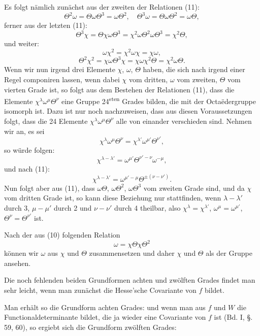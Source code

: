 
Es folgt nämlich zunächst aus der zweiten der Relationen (11):
\[
\Theta^2\omega = \Theta\omega\Theta^3 = \omega\Theta^2, \quad \Theta^3\omega = \Theta\omega\Theta^2 = \omega\Theta,
\]
ferner aus der letzten (11):
\[
\Theta^3\chi = \Theta\chi\omega\Theta^3 = \chi^2\omega\Theta^2\omega\Theta^3 = \chi^2\Theta,
\]
und weiter:
\[
\omega\chi^2 = \chi^2\omega\chi = \chi\omega,
\]
\[
\Theta^2\chi^2 = \chi\omega\Theta^3\chi = \chi\omega\chi^2\Theta = \chi^2\omega\Theta.
\]
Wenn wir nun irgend drei Elemente $\chi$, $\omega$, $\Theta$ haben, die
sich nach irgend einer Regel componiren lassen, wenn dabei $\chi$ vom
dritten, $\omega$ vom zweiten, $\Theta$ vom vierten Grade ist, so folgt aus
dem Bestehen der Relationen (11), dass die Elemente
$\chi^{\lambda}\omega^{\mu}\Theta^{\nu}$ eine Gruppe 24\textsuperscript{sten} Grades bilden, die mit
der Octaëdergruppe isomorph ist. Dazu ist nur noch nachzuweisen,
dass aus diesen Voraussetzungen folgt, dass die 24 Elemente
$\chi^{\lambda}\omega^{\mu}\Theta^{\nu}$ alle von einander verschieden sind. Nehmen wir
an, es sei
\[
\chi^{\lambda}\omega^{\mu}\Theta^{\nu} = \chi^{\lambda'}\omega^{\mu'}\Theta^{\nu'},
\]
so würde folgen:
\[
\chi^{\lambda - \lambda'} = \omega^{\mu'}\Theta^{\nu' - \nu}\omega^{-\mu},
\]
und nach (11):
\[
\chi^{\lambda - \lambda'} = \omega^{\mu' - \mu}\Theta^{\pm(\nu - \nu')}.
\]
Nun folgt aber aus (11), dass $\omega\Theta$, $\omega\Theta^2$, $\omega\Theta^3$ vom
zweiten Grade sind, und da $\chi$ vom dritten Grade ist, so kann diese
Beziehung nur stattfinden, wenn $\lambda - \lambda'$ durch 3, $\mu - \mu'$ durch 2 und
$\nu - \nu'$ durch 4 theilbar, also $\chi^{\lambda} = \chi^{\lambda'}$, $\omega^{\mu} = \omega^{\mu'}$, $\Theta^{\nu} = \Theta^{\nu'}$ ist.

Nach der aus (10) folgenden Relation
\[
\omega = \chi\Theta\chi\Theta^2
\]
können wir $\omega$ aus $\chi$ und $\Theta$ zusammensetzen und daher $\chi$ und
$\Theta$ als  der Gruppe ansehen.

Die noch fehlenden beiden Grundformen achten und zwölften
Grades findet man sehr leicht, wenn man zunächst die Hesse'sche
Covariante von $f$ bildet.

Man erhält so die Grundform achten Grades:
und wenn man aus $f$ und $W$ die Functionaldeterminante bildet,
die ja wieder eine Covariante von $f$ ist (Bd. I, \S.\,59, 60), so
ergiebt sich die Grundform zwölften Grades:
